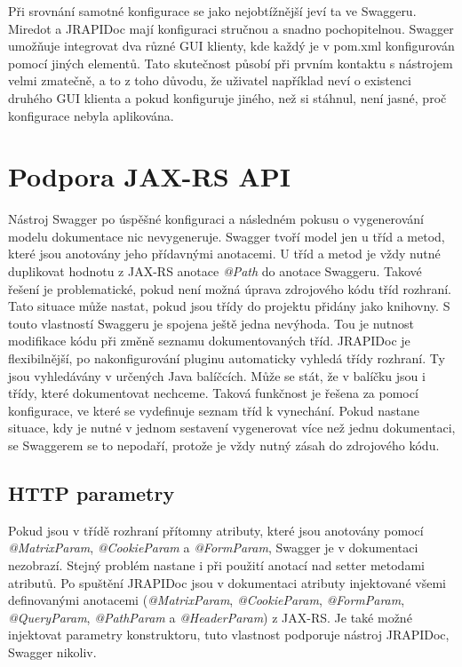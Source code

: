 \documentclass[11pt,twoside,a4paper]{book}
\begin{document}
Při srovnání samotné konfigurace se jako nejobtížnější jeví ta ve Swaggeru.
Miredot a JRAPIDoc mají konfiguraci stručnou a snadno pochopitelnou. Swagger
umožňuje integrovat dva různé GUI klienty, kde každý je v pom.xml konfigurován
pomocí jiných elementů. Tato skutečnost působí při prvním kontaktu s nástrojem
velmi zmatečně, a to z toho důvodu, že uživatel například neví o existenci
druhého GUI klienta a pokud konfiguruje jiného, než si stáhnul, není jasné, proč
konfigurace nebyla aplikována.

\section{Podpora JAX-RS API}

Nástroj Swagger po úspěšné konfiguraci a následném pokusu o vygenerování modelu
dokumentace nic nevygeneruje. Swagger tvoří model jen u tříd a metod, které jsou
anotovány jeho přídavnými anotacemi. U tříd a metod je vždy nutné duplikovat
hodnotu z JAX-RS anotace {\em @Path} do anotace Swaggeru. Takové řešení je
problematické, pokud není možná úprava zdrojového kódu tříd rozhraní. Tato
situace může nastat, pokud jsou třídy do projektu přidány jako knihovny. S touto
vlastností Swaggeru je spojena ještě jedna nevýhoda. Tou je nutnost modifikace kódu při
změně seznamu dokumentovaných tříd. JRAPIDoc je flexibilnější, po
nakonfigurování pluginu automaticky vyhledá třídy rozhraní.
Ty jsou vyhledávány v určených Java balíčcích. Může se stát, že v balíčku jsou i
třídy, které dokumentovat nechceme. Taková funkčnost je řešena za pomocí
konfigurace, ve které se vydefinuje seznam tříd k vynechání. Pokud nastane
situace, kdy je nutné v jednom sestavení vygenerovat více než jednu
dokumentaci, se Swaggerem se to nepodaří, protože je vždy nutný zásah do zdrojového kódu.

\subsection{HTTP parametry}

Pokud jsou v třídě rozhraní přítomny atributy, které jsou anotovány pomocí {\em
@MatrixParam}, {\em @CookieParam} a {\em @FormParam}, Swagger je v dokumentaci
nezobrazí. Stejný problém nastane i při použití anotací nad setter metodami
atributů. Po spuštění JRAPIDoc jsou v dokumentaci atributy injektované všemi
definovanými anotacemi ({\em @MatrixParam}, {\em @CookieParam}, {\em
@FormParam}, {\em @QueryParam}, {\em @PathParam} a {\em @HeaderParam}) z JAX-RS.
Je také možné injektovat parametry konstruktoru, tuto vlastnost podporuje
nástroj JRAPIDoc, Swagger nikoliv.
\end{document}
